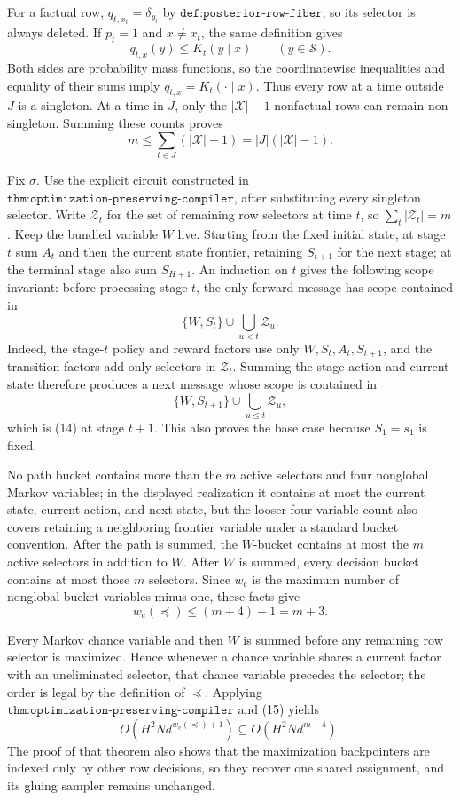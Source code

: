 For a factual row, \(q_{t,x_t}=\delta_{y_t}\) by \(\texttt{def:posterior-row-fiber}\), so its selector is always deleted.  If \(p_t=1\) and \(x\ne x_t\), the same definition gives
\[
 q_{t,x}(y)\le K_t(y\mid x)\qquad(y\in\mathcal S).
\]
Both sides are probability mass functions, so the coordinatewise inequalities and equality of their sums imply \(q_{t,x}=K_t(\cdot\mid x)\).  Thus every row at a time outside \(J\) is a singleton.  At a time in \(J\), only the \(|\mathcal X|-1\) nonfactual rows can remain non-singleton.  Summing these counts proves
\[
 m\le\sum_{t\in J}(|\mathcal X|-1)
   =|J|(|\mathcal X|-1).
 \tag{13}
\]

Fix \(\sigma\).  Use the explicit circuit constructed in \(\texttt{thm:optimization-preserving-compiler}\), after substituting every singleton selector.  Write \(\mathcal Z_t\) for the set of remaining row selectors at time \(t\), so \(\sum_t|\mathcal Z_t|=m\).  Keep the bundled variable \(W\) live.  Starting from the fixed initial state, at stage \(t\) sum \(A_t\) and then the current state frontier, retaining \(S_{t+1}\) for the next stage; at the terminal stage also sum \(S_{H+1}\).  An induction on \(t\) gives the following scope invariant: before processing stage \(t\), the only forward message has scope contained in
\[
 \{W,S_t\}\cup\bigcup_{u<t}\mathcal Z_u.
 \tag{14}
\]
Indeed, the stage-\(t\) policy and reward factors use only \(W,S_t,A_t,S_{t+1}\), and the transition factors add only selectors in \(\mathcal Z_t\).  Summing the stage action and current state therefore produces a next message whose scope is contained in
\[
 \{W,S_{t+1}\}\cup\bigcup_{u\le t}\mathcal Z_u,
\]
which is (14) at stage \(t+1\).  This also proves the base case because \(S_1=s_1\) is fixed.

No path bucket contains more than the \(m\) active selectors and four nonglobal Markov variables; in the displayed realization it contains at most the current state, current action, and next state, but the looser four-variable count also covers retaining a neighboring frontier variable under a standard bucket convention.  After the path is summed, the \(W\)-bucket contains at most the \(m\) active selectors in addition to \(W\).  After \(W\) is summed, every decision bucket contains at most those \(m\) selectors.  Since \(w_{\mathrm c}\) is the maximum number of nonglobal bucket variables minus one, these facts give
\[
 w_{\mathrm c}(\preceq)\le (m+4)-1=m+3.
 \tag{15}
\]

Every Markov chance variable and then \(W\) is summed before any remaining row selector is maximized.  Hence whenever a chance variable shares a current factor with an uneliminated selector, that chance variable precedes the selector; the order is legal by the definition of \(\preceq\).  Applying \(\texttt{thm:optimization-preserving-compiler}\) and (15) yields
\[
 O\!\left(H^2N d^{w_{\mathrm c}(\preceq)+1}\right)
 \subseteq O\!\left(H^2N d^{m+4}\right).
\]
The proof of that theorem also shows that the maximization backpointers are indexed only by other row decisions, so they recover one shared assignment, and its gluing sampler remains unchanged.

